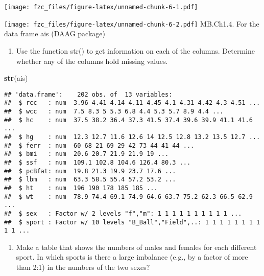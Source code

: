 \documentclass[
]{article}
\newenvironment{Shaded}{\begin{snugshade}}{\end{snugshade}}
\newcommand{\KeywordTok}[1]{\textcolor[rgb]{0.13,0.29,0.53}{\textbf{#1}}}
\newcommand{\NormalTok}[1]{#1}
\newcommand{\OperatorTok}[1]{\textcolor[rgb]{0.81,0.36,0.00}{\textbf{#1}}}
\providecommand{\tightlist}{%
  \setlength{\itemsep}{0pt}\setlength{\parskip}{0pt}}
\begin{document}
\texttt{[image: fzc\_files/figure-latex/unnamed-chunk-6-1.pdf]}

\begin{Shaded}
\end{Shaded}

\texttt{[image: fzc\_files/figure-latex/unnamed-chunk-6-2.pdf]} MB.Ch1.4.
For the data frame ais (DAAG package)

\begin{enumerate}
\def\labelenumi{(\alph{enumi})}
\tightlist
\item
  Use the function str() to get information on each of the columns.
  Determine whether any of the columns hold missing values.
\end{enumerate}

\begin{Shaded}
\begin{Highlighting}[]
\KeywordTok{str}\NormalTok{(ais)}
\end{Highlighting}
\end{Shaded}

\begin{verbatim}
## 'data.frame':    202 obs. of  13 variables:
##  $ rcc   : num  3.96 4.41 4.14 4.11 4.45 4.1 4.31 4.42 4.3 4.51 ...
##  $ wcc   : num  7.5 8.3 5 5.3 6.8 4.4 5.3 5.7 8.9 4.4 ...
##  $ hc    : num  37.5 38.2 36.4 37.3 41.5 37.4 39.6 39.9 41.1 41.6 ...
##  $ hg    : num  12.3 12.7 11.6 12.6 14 12.5 12.8 13.2 13.5 12.7 ...
##  $ ferr  : num  60 68 21 69 29 42 73 44 41 44 ...
##  $ bmi   : num  20.6 20.7 21.9 21.9 19 ...
##  $ ssf   : num  109.1 102.8 104.6 126.4 80.3 ...
##  $ pcBfat: num  19.8 21.3 19.9 23.7 17.6 ...
##  $ lbm   : num  63.3 58.5 55.4 57.2 53.2 ...
##  $ ht    : num  196 190 178 185 185 ...
##  $ wt    : num  78.9 74.4 69.1 74.9 64.6 63.7 75.2 62.3 66.5 62.9 ...
##  $ sex   : Factor w/ 2 levels "f","m": 1 1 1 1 1 1 1 1 1 1 ...
##  $ sport : Factor w/ 10 levels "B_Ball","Field",..: 1 1 1 1 1 1 1 1 1 1 ...
\end{verbatim}

\begin{enumerate}
\def\labelenumi{(\alph{enumi})}
\setcounter{enumi}{1}
\tightlist
\item
  Make a table that shows the numbers of males and females for each
  different sport. In which sports is there a large imbalance (e.g., by
  a factor of more than 2:1) in the numbers of the two sexes?
\end{enumerate}
\end{document}

